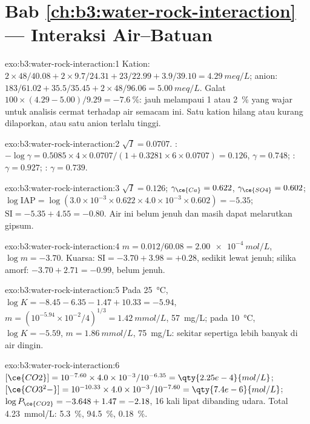 \section*{Bab \ref{ch:b3:water-rock-interaction} --- Interaksi Air--Batuan}

\begin{solution}{exo:b3:water-rock-interaction:1}
Kation: $2\times48/40.08 + 2\times9.7/24.31 + 23/22.99 + 3.9/39.10 =
\qty{4.29}{meq/L}$; anion: $183/61.02 + 35.5/35.45 + 2\times48/96.06 =
\qty{5.00}{meq/L}$. Galat $100\times(4.29 - 5.00)/9.29 = \qty{-7.6}{\percent}$:
jauh melampaui 1 atau \qty{2}{\percent} yang wajar untuk analisis cermat terhadap air semacam ini.
Satu kation hilang atau kurang dilaporkan, atau satu anion terlalu tinggi.
\end{solution}

\begin{solution}{exo:b3:water-rock-interaction:2}
$\sqrt I = 0.0707$. : $-\log\gamma = 0.5085\times4\times0.0707/(1 +
0.3281\times6\times0.0707) = 0.126$, $\gamma = 0.748$; : $\gamma =
0.927$; : $\gamma = 0.739$.
\end{solution}

\begin{solution}{exo:b3:water-rock-interaction:3}
$\sqrt I = 0.126$; $\gamma_{\ce{Ca}} = 0.622$, $\gamma_{\ce{SO4}} = 0.602$;
$\log\mathrm{IAP} = \log(3.0\times10^{-3}\times0.622\times4.0\times10^{-3}
\times0.602) = -5.35$; $\mathrm{SI} = -5.35 + 4.55 = -0.80$. Air ini
belum jenuh dan masih dapat melarutkan gipsum.
\end{solution}

\begin{solution}{exo:b3:water-rock-interaction:4}
$m = 0.012/60.08 = \qty{2.00e-4}{mol/L}$, $\log m = -3.70$. Kuarsa:
$\mathrm{SI} = -3.70 + 3.98 = +0.28$, sedikit lewat jenuh; silika
amorf: $-3.70 + 2.71 = -0.99$, belum jenuh.
\end{solution}

\begin{solution}{exo:b3:water-rock-interaction:5}
Pada \qty{25}{\celsius}, $\log K = -8.45 - 6.35 - 1.47 + 10.33 = -5.94$, $m =
(10^{-5.94}\times10^{-2}/4)^{1/3} = \qty{1.42}{mmol/L}$, \qty{57}{mg/L}; pada
\qty{10}{\celsius}, $\log K = -5.59$, $m = \qty{1.86}{mmol/L}$,
\qty{75}{mg/L}: sekitar sepertiga lebih banyak di air dingin.
\end{solution}

\begin{solution}{exo:b3:water-rock-interaction:6}
$[\ce{CO2}] = 10^{-7.60}\times4.0\times10^{-3}/10^{-6.35} =
\qty{2.25e-4}{mol/L}$; $[\ce{CO3^2-}] = 10^{-10.33}\times4.0\times10^{-3}/
10^{-7.60} = \qty{7.4e-6}{mol/L}$; $\log P_{\ce{CO2}} = -3.648 + 1.47 =
-2.18$, 16 kali lipat dibanding udara. Total \qty{4.23}{mmol/L}: 
\qty{5.3}{\percent},  \qty{94.5}{\percent}, 
\qty{0.18}{\percent}.
\end{solution}

